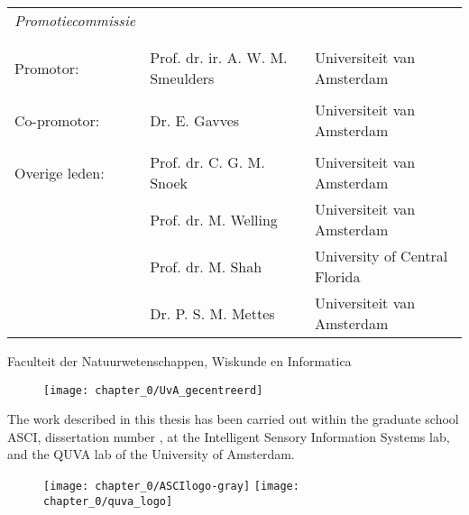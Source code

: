 
\begin{tabular}{lll}
\textit{Promotiecommissie} & & \\
& & \\
& & \\
Promotor: 		& Prof. dr. ir. A. W. M. Smeulders 	& Universiteit van Amsterdam\\
& & \\
Co-promotor: 	& Dr. E. Gavves						& Universiteit van Amsterdam\\
& & \\
Overige leden: 	& Prof. dr. C. G. M. Snoek 			& Universiteit van Amsterdam\\
				& Prof. dr. M. Welling 				& Universiteit van Amsterdam \\
				& Prof. dr. M. Shah 				& University of Central Florida \\
				& Dr. P. S. M. Mettes 				& Universiteit van Amsterdam \\

\end{tabular}

\vspace{0.4cm}

\hspace{0.15cm} Faculteit der Natuurwetenschappen, Wiskunde en Informatica

\vfill

\begin{figure}[htb]
\centering
\texttt{[image: chapter\_0/UvA\_gecentreerd]}
\end{figure}

\vspace{15mm}

\noindent
The work described in this thesis has been carried out within the graduate school ASCI, dissertation number , at the Intelligent Sensory Information Systems lab, and the QUVA lab of the University of Amsterdam.

\vspace{5mm}

\begin{figure}[!htb]
\centering
\texttt{[image: chapter\_0/ASCIlogo-gray]}
\hspace{100pt}
\texttt{[image: chapter\_0/quva\_logo]}
\end{figure}